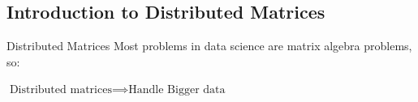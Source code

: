 \subsection{Introduction to Distributed Matrices}
\makesubcontentsslidessec


\begin{frame}
  \begin{block}{Distributed Matrices}\pause
  Most problems in data science are matrix algebra problems, so:
  \begin{center}
  $\text{Distributed matrices} \implies \text{Handle Bigger data}$
  \end{center}
  \end{block}
\end{frame}


% 
% 



